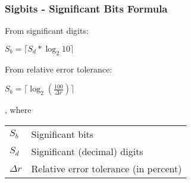 \documentclass[compress]{beamer}
\begin{document}
\begin{frame}
	\frametitle{Sigbits - Significant Bits Formula}

	From significant digits:
	\begin{center}
		$S_{b} = \lceil S_d * \log_2{10}\rceil$
	\end{center}

	\bigskip

	From relative error tolerance:
	\begin{center}
		$S_{b} = \lceil \log_2{\left(\frac{100}{\Delta{r}}\right)}\rceil$
	\end{center}

	, where\\

	\bigskip

	\begin{tabular}{ll}
		$S_b$ & Significant bits \\
		$S_d$ & Significant (decimal) digits \\
		$\Delta{r}$ & Relative error tolerance (in percent)
	\end{tabular}

\end{frame}
\end{document}
